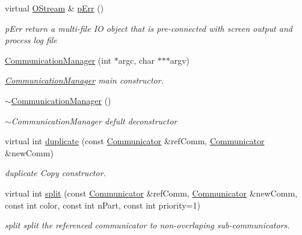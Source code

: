 \begin{DoxyCompactItemize}
virtual \hyperlink{classHSF_1_1OStream}{OStream} \& \hyperlink{classHSF_1_1CommunicationManager_a416b9b36a5831fee0b931405bcad3e97}{pErr} ()
\begin{DoxyCompactList}\small\item\em pErr return a multi-\/file IO object that is pre-\/connected with screen output and process log file \item\end{DoxyCompactList}\item 
\hyperlink{classHSF_1_1CommunicationManager_a2323f6f52600227b24cf9e5419565206}{CommunicationManager} (int $\ast$argc, char $\ast$$\ast$$\ast$argv)
\begin{DoxyCompactList}\small\item\em \hyperlink{classHSF_1_1CommunicationManager}{CommunicationManager} main constructor. \item\end{DoxyCompactList}\item 
\hyperlink{classHSF_1_1CommunicationManager_ab98fc8b313467c85105bad87a7195cd8}{$\sim$CommunicationManager} ()
\begin{DoxyCompactList}\small\item\em $\sim$CommunicationManager defult deconstructor \item\end{DoxyCompactList}\item 
virtual int \hyperlink{classHSF_1_1CommunicationManager_aa506879f09f9f0d3853a38bd5957024d}{duplicate} (const \hyperlink{classHSF_1_1Communicator}{Communicator} \&refComm, \hyperlink{classHSF_1_1Communicator}{Communicator} \&newComm)
\begin{DoxyCompactList}\small\item\em duplicate Copy constructor. \item\end{DoxyCompactList}\item 
virtual int \hyperlink{classHSF_1_1CommunicationManager_abf8f44565535ca264f90ea7c44baf618}{split} (const \hyperlink{classHSF_1_1Communicator}{Communicator} \&refComm, \hyperlink{classHSF_1_1Communicator}{Communicator} \&newComm, const int color, const int nPart, const int priority=1)
\begin{DoxyCompactList}\small\item\em split split the referenced communicator to non-\/overlaping sub-\/communicators. \item\end{DoxyCompactList}\item 

\end{DoxyCompactItemize}
